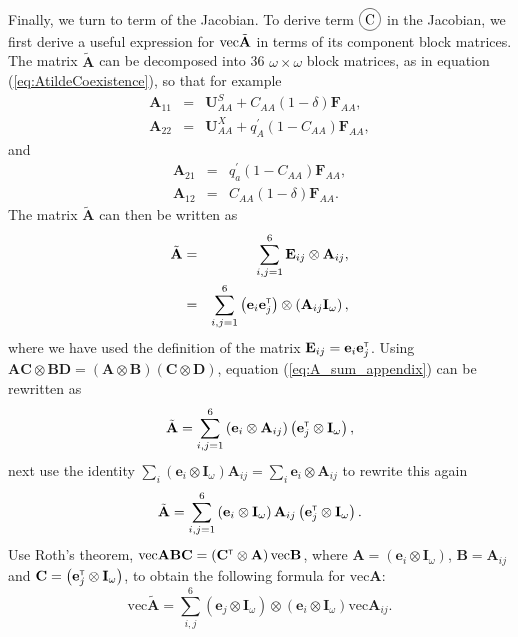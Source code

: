 \documentclass[11pt]{article}
\newcommand*\circled[1]{\tikz[baseline=(char.base)]{
            \node[shape=circle,draw,inner sep=2pt] (char) {#1};}}
\def\mbf#1{\mathbf{#1}}
\newcommand{\bo}[1]{{\bf #1}}
\newcommand{\tr}{{\mbox{\tiny \sf T}}}
\begin{document}
Finally, we turn to term \circled{C} of the Jacobian. 
To derive term $\circled{C}$ in the Jacobian, we first derive a useful expression for $\text{vec} \tilde{\bo A}$ in terms of its component block matrices. The matrix $\tilde{\mathbf{A}}$ can be decomposed into 36 $\omega \times \omega$ block matrices, as in equation (\ref{eq:AtildeCoexistence}), so that for example 
\begin{eqnarray}
\mathbf{A}_{11}&=&  \mathbf{U}^S_{AA} + C_{AA} (1 - \delta) \mbf{F}_{AA} ,\\
\mathbf{A}_{22}&=&\mathbf{U}^X_{AA} +q^{\prime}_{A} (1 - C_{AA}) \mbf{F}_{AA},
\end{eqnarray}
and
\begin{eqnarray}
  \mathbf{A}_{21}&=&q^{\prime}_{a} (1 - C_{AA}) \mbf{F}_{AA},\\
  \mathbf{A}_{12}&=& C_{AA} (1 - \delta) \mbf{F}_{AA} .
\end{eqnarray}
The matrix $\tilde{\mathbf{A}}$ can then be written as 
\begin{eqnarray}
\tilde{\mathbf{A}}&=&\sum_{i,j=1}^6 \mathbf{E}_{ij} \otimes \mathbf{A}_{ij}, \\
&=&\sum_{i,j=1}^6 \left(\mathbf{e}_i \mathbf{e}^\tr_j\right) \otimes \left(\mathbf{A}_{ij} \mathbf{I}_\omega \right),
\label{eq:A_sum_appendix}
\end{eqnarray}
where we have used the definition of the matrix $\mathbf{E}_{ij}=\mathbf{e}_i \mathbf{e}^\tr_j$. Using $\mathbf{A} \mathbf{C}\otimes \mathbf{B} \mathbf{D}=(\mathbf{A} \otimes \mathbf{B}) (\mathbf{C} \otimes \mathbf{D})$, equation (\ref{eq:A_sum_appendix}) can be rewritten as
\begin{equation}
  \tilde{\mathbf{A}}=\sum_{i,j=1}^6 \left(\mathbf{e}_i \otimes \mathbf{A}_{ij} \right) \left( \mathbf{e}^\tr_j \otimes \mathbf{I}_\omega \right) ,
\end{equation}
next use the identity $ \sum_i \left( \mathbf{e}_i \otimes \mathbf{I}_\omega \right) \mathbf{A}_{ij} = \sum_i \mathbf{e}_i \otimes \mathbf{A}_{ij}$ to rewrite this again 
\begin{eqnarray}
\tilde{\mathbf{A}}=\sum_{i,j=1}^6 \left(\mathbf{e}_i \otimes  \mathbf{I}_\omega \right) \mathbf{A}_{ij} \left( \mathbf{e}^\tr_j \otimes \mathbf{I}_\omega \right).
  \end{eqnarray}
Use Roth's theorem, $\text{vec}\mathbf{A}\mathbf{B}\mathbf{C}=\left(\mathbf{C}^\tr \otimes \mathbf{A}\right) \text{vec} \mathbf{B}$, where $\mathbf{A}=\left(\mathbf{e}_i \otimes  \mathbf{I}_\omega \right)$, $\mathbf{B}=\mathbf{A}_{ij}$ and $\mathbf{C}=\left( \mathbf{e}^\tr_j \otimes \mathbf{I}_\omega \right)$, to obtain the following formula for  $\mbox{vec}\mathbf{A}$:
\begin{equation}
\mbox{vec}\tilde{\mathbf{A}}=\sum_{i,j}^6 \left(\mathbf{e}_j \otimes \mathbf{I}_\omega\right) \otimes \left(\mathbf{e}_i \otimes \mathbf{I}_\omega\right)\mbox{vec}\mathbf{A}_{ij}. \label{eq:vecAinAijs}
\end{equation}
\end{document}
